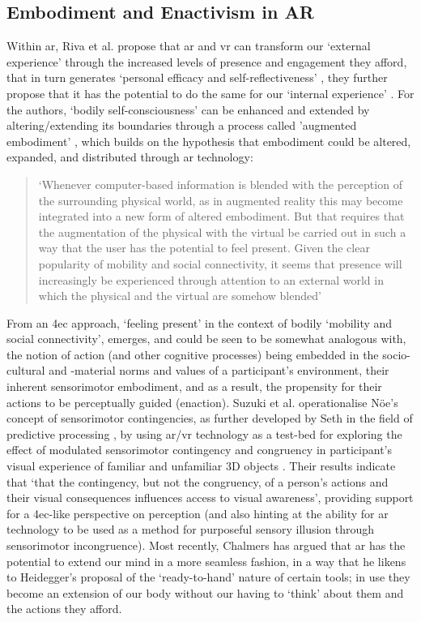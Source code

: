 \subsection{Embodiment and Enactivism in AR}\label{sec: theory-embodimentar}
Within \gls{ar}, Riva et al. propose that \gls{ar} and \gls{vr} can transform our `external experience' through the increased levels of presence and engagement they afford, that in turn generates `personal efficacy and self-reflectiveness' \citeyearpar[p. 10]{riva2016}, they further propose that it has the potential to do the same for our `internal experience' . For the authors, `bodily self-consciousness' can be enhanced and extended by altering/extending its boundaries through a process called 'augmented embodiment' , which builds on the hypothesis that embodiment could be altered, expanded, and distributed through \gls{ar} technology: 
\begin{quote}
    `Whenever computer-based information is blended with the perception of the surrounding physical world, as in augmented reality this may become integrated into a new form of altered embodiment. But that requires that the augmentation of the physical with the virtual be carried out in such a way that the user has the potential to feel present. Given the clear popularity of mobility and social connectivity, it seems that presence will increasingly be experienced through attention to an external world in which the physical and the virtual are somehow blended' \citep[]{waterworth2014}
\end{quote}
From an \gls{4ec} approach, `feeling present' in the context of bodily `mobility and social connectivity', emerges, and could be seen to be somewhat analogous with, the notion of action (and other cognitive processes) being embedded in the  socio-cultural and -material norms and values of a participant's environment, their inherent sensorimotor embodiment, and as a result, the propensity for their actions to be perceptually guided (enaction). Suzuki et al. operationalise Nöe's \citeyearpar[]{noe2004} concept of sensorimotor contingencies, as further developed by Seth in the field of predictive processing \citeyearpar[]{seth2014}, by using \gls{ar}/\gls{vr} technology as a test-bed for exploring the effect of modulated sensorimotor contingency and congruency in participant's visual experience of familiar and unfamiliar 3D objects \citep[]{suzuki2019}. Their results indicate that `that the contingency, but not the congruency, of a person's actions and their visual consequences influences access to visual awareness', providing support for a \gls{4ec}-like perspective on perception (and also hinting at the ability for \gls{ar} technology to be used as a method for purposeful sensory illusion through sensorimotor incongruence). Most recently, Chalmers has argued that \gls{ar} has the potential to extend our mind in a more seamless fashion, in a way that he likens to Heidegger's proposal of the `ready-to-hand' nature of certain tools; in use they become an extension of our body without our having to `think' about them and the actions they afford.
